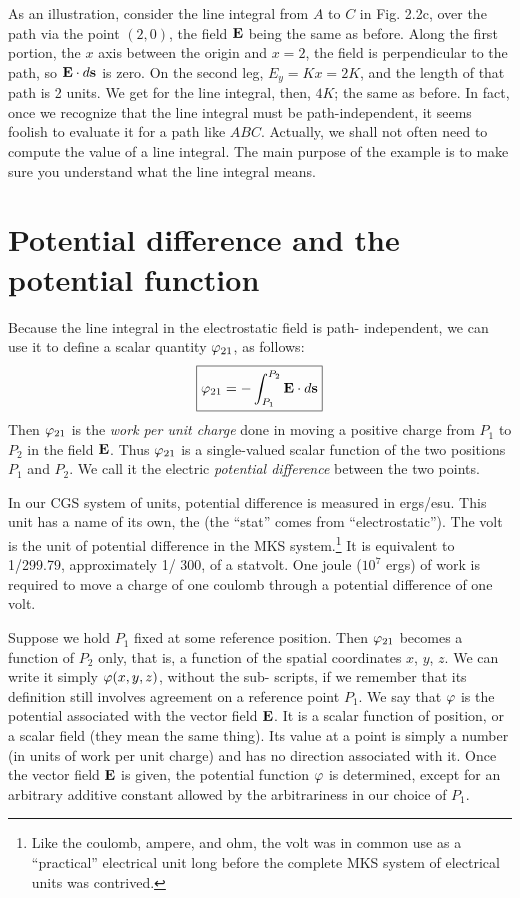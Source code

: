 As an illustration, consider the line integral from $A$ to $C$ in Fig. 2.2c,
over the path via the point $(2,0)$, the field $\mathbf{E}$ being the same as before.
Along the first portion, the $x$ axis between the origin and $x = 2$, the
field is perpendicular to the path, so $\mathbf{E}\cdot d\mathbf{s}$ is zero. On the second leg,
$E_y = Kx = 2K$, and the length of that path is 2 units. We get for the
line integral, then, $4K$; the same as before. In fact, once we recognize
that the line integral must be path-independent, it seems foolish to
evaluate it for a path like $ABC$. Actually, we shall not often need to
compute the value of a line integral. The main purpose of the example
is to make sure you understand what the line integral means.

\section{Potential difference and the potential function}
Because the line integral in the electrostatic field is path-
independent, we can use it to define a scalar quantity $\varphi_{21}$, as follows:
\begin{equation}
\boxed{
  \varphi_{21} = -\int_{P_1}^{P_2} \mathbf{E}\cdot d\mathbf{s}
}
\end{equation}
Then $\varphi_{21}$ is the \emph{work per unit charge} done in moving a positive
charge from $P_1$ to $P_2$ in the field $\mathbf{E}$. Thus $\varphi_{21}$ is a single-valued scalar
function of the two positions $P_1$ and $P_2$. We call it the electric
\emph{potential difference}
between the two points.

In our CGS system of units, potential difference is measured in
ergs/esu. This unit has a name of its own, the  (the ``stat''
comes from ``electrostatic''). The volt is the unit of potential difference
in the MKS system.\footnote{Like the coulomb, ampere, and
ohm, the volt was in common use as a ``practical''
electrical unit long before the complete MKS system of electrical units was contrived.}
It is equivalent to 1/299.79, approximately
1/ 300, of a statvolt. One joule ($10^7$ ergs) of work is required
to move a charge of one coulomb through a potential difference of
one volt.

Suppose we hold $P_1$ fixed at some reference position. Then $\varphi_{21}$
becomes a function of $P_2$ only, that is, a function of the spatial coordinates
$x$, $y$, $z$. We can write it simply $\varphi(x,y,z)$, without the sub-
scripts, if we remember that its definition still involves agreement
on a reference point $P_1$. We say that $\varphi$ is the potential associated with
the vector field $\mathbf{E}$. It is a scalar function of position, or a scalar field
(they mean the same thing). Its value at a point is simply a number
(in units of work per unit charge) and has no direction associated
with it. Once the vector field $\mathbf{E}$ is given, the potential function $\varphi$
is determined, except for an arbitrary additive constant allowed by
the arbitrariness in our choice of $P_1$.


